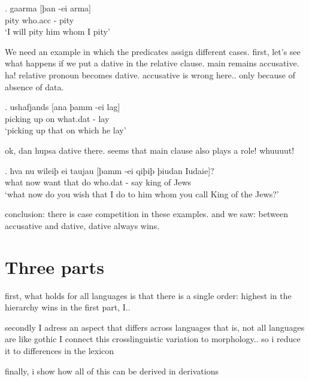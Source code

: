 \exg. gaarma [þan -ei arma]\\
 pity\scsub{[acc]} who.\ac{acc} - pity\scsub{[acc]}\\
 `I will pity him whom I pity' \label{ex:gothicaccacc}

We need an example in which the predicates assign different cases. first, let's see what happens if we put a dative in the relative clause. main remains accusative. ha! relative pronoun becomes dative. accusative is wrong here.. only because of absence of data.

\exg. ushafjands [ana þamm -ei lag]\\
 {picking up}\scsub{[acc]} on\scsub{[dat]} what.\ac{dat} - lay\\
 `picking up that on which he lay' 

ok, dan hupsa dative there. seems that main clause also plays a role! whuuuut!

\exg. hva nu wileiþ ei taujau [þamm -ei qiþiþ þiudan Iudaie]?\\
 what now want that do\scsub{[dat]} who.\ac{dat} - say\scsub{[acc]} king {of Jews}\\
 `what now do you wish that I do to him whom you call King of the Jews?' 

conclusion: there is case competition in these examples. and we saw: between accusative and dative, dative always wins.




\section{Three parts}

first, what holds for all languages is that there is a single order: highest in the hierarchy wins
in the first part, I..

secondly I adress an aspect that differs across languages
that is, not all languages are like gothic
I connect this crosslinguistic variation to morphology.. so i reduce it to differences in the lexicon

finally, i show how all of this can be derived in derivations
